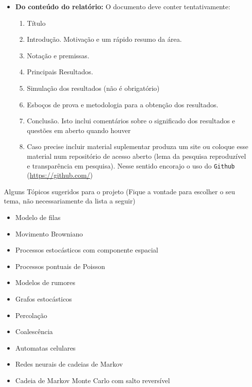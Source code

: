 \documentclass[a4paper,10pt,oneside,twocolumn]{Config/milktest}
\begin{document}
\begin{itemize}
\item {\bf Do conteúdo do relatório:}  O documento deve conter tentativamente: 
\begin{enumerate}
\item Título  
\item Introdução. Motivação e um rápido resumo da área.
\item Notação e premissas.
\item Principais Resultados.
\item Simulação dos resultados (não é obrigatório)
\item  Esboços de prova e metodologia para a obtenção dos resultados. 
\item Conclusão. Isto inclui comentários sobre o significado dos resultados e questões em aberto quando houver
\item Caso precise incluir material suplementar produza um site ou coloque esse material num repositório de acesso aberto (lema da pesquisa reproduzível e transparência em pesquisa). Nesse sentido encorajo o uso do {\tt Github} (\url{https://github.com/}) 
\end{enumerate}
\end{itemize}

Alguns Tópicos sugeridos para o projeto 
(Fique a vontade para escolher o seu tema, não necessariamente da lista a seguir)

\begin{itemize}
    \item Modelo de filas
    \item Movimento Browniano
    \item Processos estocásticos com componente espacial
    \item Processos pontuais de Poisson
    \item Modelos de rumores
    \item Grafos estocásticos
    \item Percolação
    \item Coalescência
    \item Automatas celulares
    \item Redes neurais de cadeias de Markov
    \item Cadeia de Markov Monte Carlo com salto reversível
\end{itemize}

\bigskip


\centering\color{cor}{\scshape boa prova}
\end{document}
